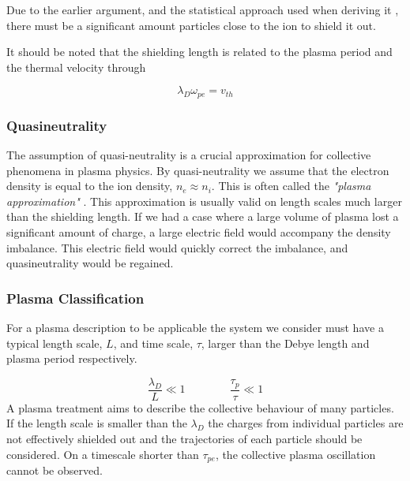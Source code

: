 		Due to the earlier argument, and the statistical approach used when deriving it \citep{goldston_introduction_1995},
		there must be a significant amount particles close to the ion to shield it out.

		It should be noted that the shielding length is related \citep{fitzpatrick_plasma_2014} to
		the plasma period and the thermal velocity through

		\begin{equation}
			\lambda_D \omega_{pe} = v_{th}
		\end{equation}


		\subsubsection{Quasineutrality}
		The assumption of quasi-neutrality is a crucial approximation for collective phenomena in plasma
		physics. By quasi-neutrality we assume that the electron
		density is equal to the ion density, \(n_e \approx n_i\). This is often called the
		\textit{"plasma approximation"} \citep{chen_introduction_1984}.
		This approximation is usually valid on length scales much larger than the shielding
		length. If we had a case where a large volume of plasma lost a significant
		amount of charge, a large electric field would accompany the density imbalance.
		This electric field would quickly correct the imbalance, and quasineutrality
		would be regained.

		\subsubsection{Plasma Classification}
        For a plasma description to be applicable the system we consider must have
        a typical length scale, \(L\), and time scale, \(\tau\), larger than the Debye length and plasma
        period respectively.

        \[\frac{\lambda_D}{L} \ll 1  \qquad{} \qquad \frac{\tau_p}{\tau} \ll 1 \]
		A plasma treatment aims to describe the collective behaviour of many particles.
		If the length scale is smaller than the \(\lambda_D\) the charges from
		individual particles are not effectively shielded out and the trajectories of each particle should
		be considered. On a timescale shorter than \(\tau_{pe}\), the collective plasma oscillation cannot be observed.

















